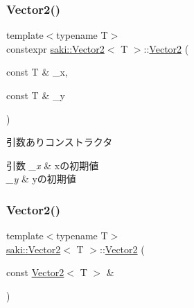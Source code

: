 \subsubsection{\texorpdfstring{Vector2()}{Vector2()}\hspace{0.1cm}{\footnotesize\ttfamily [2/4]}}
{\footnotesize\ttfamily template$<$typename T$>$ \\
constexpr \mbox{\hyperlink{classsaki_1_1_vector2}{saki\+::\+Vector2}}$<$ T $>$\+::\mbox{\hyperlink{classsaki_1_1_vector2}{Vector2}} (\begin{DoxyParamCaption}\item[{const T \&}]{\+\_\+x,  }\item[{const T \&}]{\+\_\+y }\end{DoxyParamCaption})\hspace{0.3cm}{\ttfamily [inline]}}



引数ありコンストラクタ 


\begin{DoxyParams}{引数}
{\em \+\_\+x} & xの初期値 \\
\hline
{\em \+\_\+y} & yの初期値 \\
\hline
\end{DoxyParams}
\mbox{\label{classsaki_1_1_vector2_af3d61bb90047a8621cba0a17b265bfaa}} 
\subsubsection{\texorpdfstring{Vector2()}{Vector2()}\hspace{0.1cm}{\footnotesize\ttfamily [3/4]}}
{\footnotesize\ttfamily template$<$typename T$>$ \\
\mbox{\hyperlink{classsaki_1_1_vector2}{saki\+::\+Vector2}}$<$ T $>$\+::\mbox{\hyperlink{classsaki_1_1_vector2}{Vector2}} (\begin{DoxyParamCaption}\item[{const \mbox{\hyperlink{classsaki_1_1_vector2}{Vector2}}$<$ T $>$ \&}]{ }\end{DoxyParamCaption})\hspace{0.3cm}{\ttfamily [default]}}

\mbox{\label{classsaki_1_1_vector2_abb8b6443d50d1008bf95569019414234}} 

